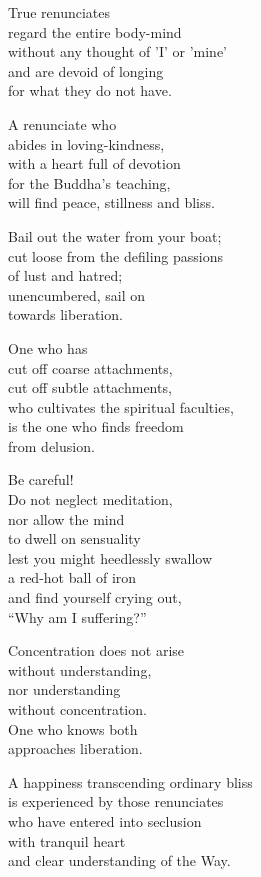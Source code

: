 True renunciates\\
regard the entire body-mind\\
without any thought of ’I’ or ’mine’\\
and are devoid of longing\\
for what they do not have.


A renunciate who\\
abides in loving-kindness,\\
with a heart full of devotion\\
for the Buddha's teaching,\\
will find peace, stillness and bliss.


Bail out the water from your boat;\\
cut loose from the defiling passions\\
of lust and hatred;\\
unencumbered, sail on\\
towards liberation.


One who has\\
cut off coarse attachments,\\
cut off subtle attachments,\\
who cultivates the spiritual faculties,\\
is the one who finds freedom\\
from delusion.


Be careful!\\
Do not neglect meditation,\\
nor allow the mind\\
to dwell on sensuality\\
lest you might heedlessly swallow\\
a red-hot ball of iron\\
and find yourself crying out,\\
“Why am I suffering?”


Concentration does not arise\\
without understanding,\\
nor understanding\\
without concentration.\\
One who knows both\\
approaches liberation.


A happiness transcending ordinary bliss\\
is experienced by those renunciates\\
who have entered into seclusion\\
with tranquil heart\\
and clear understanding of the Way.


